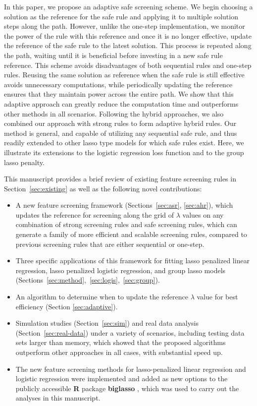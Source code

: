 In this paper, we propose an adaptive safe screening scheme. We begin choosing a solution as the reference for the safe rule and applying it to multiple solution steps along the path. However, unlike the one-step implementation, we monitor the power of the rule with this reference and once it is no longer effective, update the reference of the safe rule to the latest solution.  This process is repeated along the path, waiting until it is beneficial before investing in a new safe rule reference. This scheme avoids disadvantages of both sequential rules and one-step rules. Reusing the same solution as reference when the safe rule is still effective avoids unnecessary computations, while periodically updating the reference ensures that they maintain power across the entire path. We show that this adaptive approach can greatly reduce the computation time and outperforms other methods in all scenarios. Following the hybrid approaches, we also combined our approach with strong rules to form adaptive hybrid rules. Our method is general, and capable of utilizing any sequential safe rule, and thus readily extended to other lasso type models for which safe rules exist. Here, we illustrate its extensions to the logistic regression loss function and to the group lasso penalty.

This manuscript provides a brief review of existing feature screening rules in Section~\ref{sec:existing} as well as the following novel contributions:

\begin{itemize}
    \item A new feature screening framework (Sections~\ref{sec:asr}, \ref{sec:ahr}), which updates the reference for screening along the grid of $\lambda$ values on any combination of strong screening rules and safe screening rules, which can generate a family of more efficient and scalable screening rules, compared to previous screening rules that are either sequential or one-step.
    \item Three specific applications of this framework for fitting lasso penalized linear regression, lasso penalized logistic regression, and group lasso models (Sections~\ref{sec:method},~\ref{sec:logis},~\ref{sec:group}).
    \item An algorithm to determine when to update the reference $\lambda$ value for best efficiency (Section \ref{sec:adaptive}).
    \item Simulation studies (Section~\ref{sec:sim}) and real data analysis (Section~\ref{sec:real-data}) under a variety of scenarios, including testing data sets larger than memory, which showed that the proposed algorithms outperform other approaches in all cases, with substantial speed up.
    \item The new feature screening methods for lasso-penalized linear regression and logistic regression were implemented and added as new options to the publicly accessible \textbf{R} package \textbf{biglasso} \citep{zeng2017biglasso}, which was used to carry out the analyses in this manuscript.
\end{itemize}

